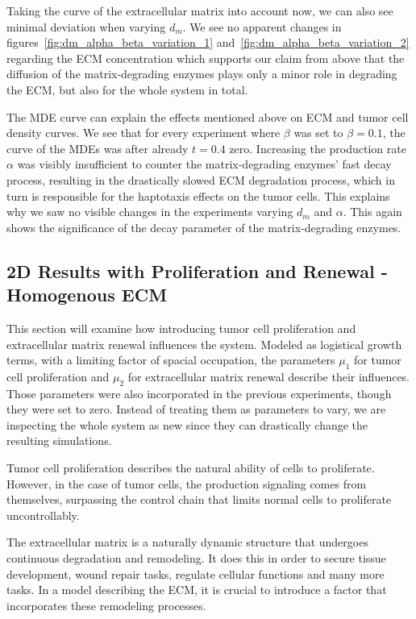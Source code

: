 Taking the curve of the extracellular matrix into account now, we can also see minimal deviation when varying $d_m$. We see no apparent changes in figures~\ref{fig:dm_alpha_beta_variation_1} and~\ref{fig:dm_alpha_beta_variation_2} regarding the ECM concentration which supports our claim from above that the diffusion of the matrix-degrading enzymes plays only a minor role in degrading the ECM, but also for the whole system in total.

The MDE curve can explain the effects mentioned above on ECM and tumor cell density curves. We see that for every experiment where $\beta$ was set to $\beta=0.1$, the curve of the MDEs was after already $t=0.4$ zero. Increasing the production rate $\alpha$ was visibly insufficient to counter the matrix-degrading enzymes' fast decay process, resulting in the drastically slowed ECM degradation process, which in turn is responsible for the haptotaxis effects on the tumor cells. This explains why we saw no visible changes in the experiments varying $d_m$ and $\alpha$. This again shows the significance of the decay parameter of the matrix-degrading enzymes. 


\subsection{2D Results with Proliferation and Renewal - Homogenous ECM}
This section will examine how introducing tumor cell proliferation and extracellular matrix renewal influences the system. Modeled as logistical growth terms, with a limiting factor of spacial occupation, the parameters $\mu_1$ for tumor cell proliferation and $\mu_2$ for extracellular matrix renewal describe their influences. Those parameters were also incorporated in the previous experiments, though they were set to zero. Instead of treating them as parameters to vary, we are inspecting the whole system as new since they can drastically change the resulting simulations.

Tumor cell proliferation describes the natural ability of cells to proliferate. However, in the case of tumor cells, the production signaling comes from themselves, surpassing the control chain that limits normal cells to proliferate uncontrollably.

The extracellular matrix is a naturally dynamic structure that undergoes continuous degradation and remodeling. It does this in order to secure tissue development, wound repair tasks, regulate cellular functions and many more tasks. In a model describing the ECM, it is crucial to introduce a factor that incorporates these remodeling processes.

